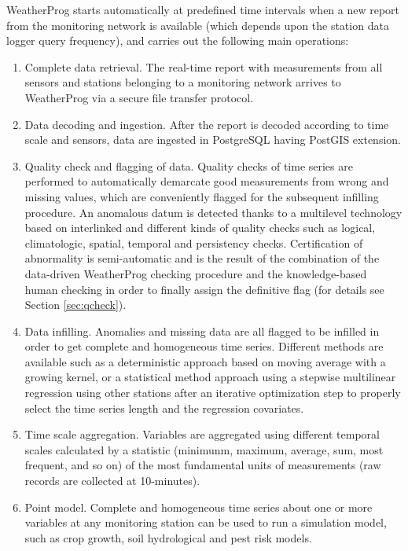 \documentclass[authoryear,preprint,review,12pt]{elsarticle}
\begin{document}
WeatherProg starts automatically at predefined time intervals when a new report from the monitoring network is available (which depends upon the station data logger query frequency), and carries out the following main operations:
\begin{enumerate}
    \item Complete data retrieval. The real-time report with measurements from all sensors and stations belonging to a monitoring network arrives to WeatherProg via a secure file transfer protocol.
    
    \item Data decoding and ingestion. After the report is decoded according to time scale and sensors, data are ingested in PostgreSQL having PostGIS extension.

    \item Quality check and flagging of data. Quality checks of time series are performed to automatically demarcate good measurements from wrong and missing values, which are conveniently flagged for the subsequent infilling procedure.
    An anomalous datum is detected thanks to a multilevel technology based on interlinked and different kinds of quality checks such as logical, climatologic, spatial, temporal and persistency checks. Certification of abnormality is semi-automatic and is the result of the combination of the data-driven WeatherProg checking procedure and the knowledge-based human checking in order to finally assign the definitive flag (for details see Section \ref{sec:qcheck}).
    
    \item Data infilling. Anomalies and missing data are all flagged to be %
    infilled in order to get complete and homogeneous time series.
    Different methods are available such as a deterministic approach based on moving average with a growing kernel, or a statistical method approach using a stepwise multilinear regression using other stations after an iterative optimization step to properly select the time series length and the regression covariates.
    
    \item Time scale aggregation. Variables are aggregated using different temporal scales calculated by a statistic (minimunm, maximum, average, sum, most frequent, and so on) of the most fundamental units of measurements (raw records are collected at 10-minutes).
    
    \item Point model. Complete and homogeneous time series about one or more variables at any monitoring station can be used to run a simulation model, such as crop growth, soil hydrological and pest risk models.
    

\end{enumerate}
\end{document}
